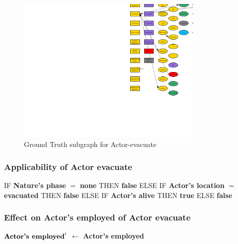 \documentclass{article}%
\begin{document}
\begin{figure}[ht]%
\centering%
\includegraphics[width=0.8\textwidth]{images/Actor-evacuate.png}%
\caption{Ground Truth subgraph for Actor{-}evacuate}%
\end{figure}

%
\subsubsection{Applicability of Actor evacuate}%
\label{ssubsec:Applicability of Actor evacuate}%
\begin{flushleft}%
IF %
\textbf{Nature's phase}%
$=$%
\textbf{none}%
\linebreak%
\hspace*{2em}%
THEN %
\textbf{false}%
\linebreak%
\hspace*{2em}%
ELSE %
IF %
\textbf{Actor's location}%
$=$%
\textbf{evacuated}%
\linebreak%
\hspace*{4em}%
THEN %
\textbf{false}%
\linebreak%
\hspace*{4em}%
ELSE %
IF %
\textbf{Actor's alive}%
\linebreak%
\hspace*{6em}%
THEN %
\textbf{true}%
\linebreak%
\hspace*{6em}%
ELSE %
\textbf{false}%
\end{flushleft}

%
\subsubsection{Effect on Actor's employed of Actor evacuate}%
\label{ssubsec:Effect on Actor's employed of Actor evacuate}%
\begin{flushleft}%
$\mbox{\textbf{Actor's employed}} '$%
$\leftarrow$%
\textbf{Actor's employed}%
\end{flushleft}
\end{document}
